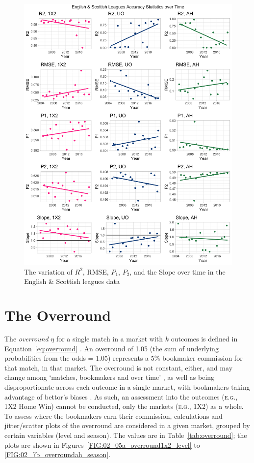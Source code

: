 \documentclass[a4paper,10pt]{report}
\begin{document}
\begin{figure}[hp]\begin{center}
		\includegraphics[width=\textwidth]{ensco_20_seasontimeplots.png}
		\caption{The variation of $R^2$, RMSE, $P_1$, $P_2$, and the Slope over time in the English \& Scottish leagues data}\label{FIG:02_accuracytime}
\end{center}\end{figure}


\pagebreak

\section{The Overround}\label{sec:overround}
The \textit{overround} $\eta$ for a single match in a market with $k$ outcomes is defined in Equation~\ref{eq:overround} \autocite{overround}. An overround of 1.05 (the sum of underlying probabilities from the odds = 1.05) represents a 5\% bookmaker commission for that match, in that market. The overround is not constant, either, and may change among `matches, bookmakers and over time' \autocite{angelini19}, as well as being disproportionate across each outcome in a single market, with bookmakers taking advantage of bettor's biases \autocite{levitt04}. As such, an assessment into the outcomes (\textsc{e.g.}, 1X2 Home Win) cannot be conducted, only the markets (\textsc{e.g.}, 1X2) as a whole. To assess where the bookmakers earn their commission, calculations and jitter/scatter plots of the overround are considered in a given market, grouped by certain variables (level and season). The values are in Table~\ref{tab:overround}; the plots are shown in Figures~\ref{FIG:02_05a_overround1x2_level} to \ref{FIG:02_7b_overroundah_season}.
\end{document}

